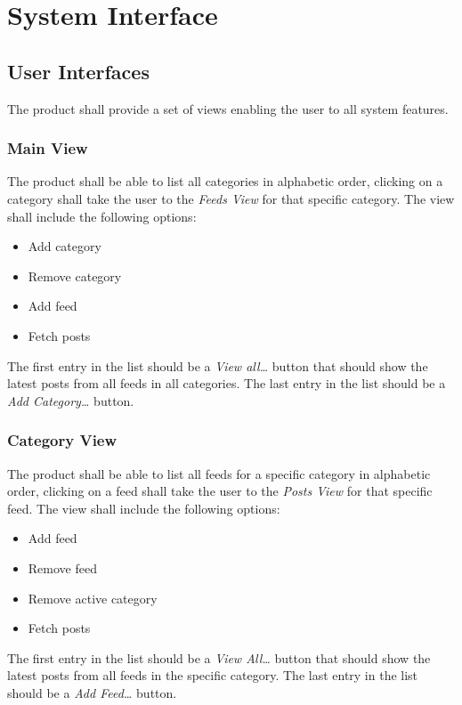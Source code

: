 \section{System Interface}


\subsection{User Interfaces}
The product shall provide a set of views enabling the user to all system features. 

\subsubsection{Main View}
The product shall be able to list all categories in alphabetic order, clicking on a category shall take the user to the \textit{Feeds View} for that specific category. The view shall include the following options:

\begin{itemize}
  \item Add category
  \item Remove category
  \item Add feed
  \item Fetch posts
\end{itemize}
The first entry in the list should be a \textit{View all\ldots} button that should show the latest posts from all feeds in all categories. The last entry in the list should be a \textit{Add Category\ldots} button.


\subsubsection{Category View}
The product shall be able to list all feeds for a specific category in alphabetic order, clicking on a feed shall take the user to the \textit{Posts View} for that specific feed. The view shall include the following options:

\begin{itemize}
  \item Add feed
  \item Remove feed
  \item Remove active category
  \item Fetch posts
\end{itemize}
The first entry in the list should be a \textit{View All\ldots} button that should show the latest posts from all feeds in the specific category. The last entry in the list should be a \textit{Add Feed\ldots} button.


